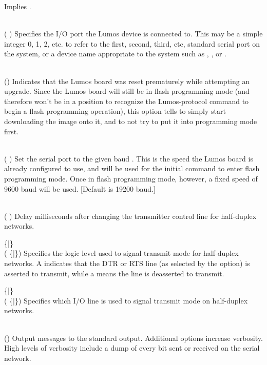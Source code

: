 \begin{list}{}{}
Implies
.
\item[{\codetype{----port=}\Var*{dev}}]\hfill\\
(
)
Specifies the I/O port the Lumos device is connected to.  This may be a simple integer 0, 1, 2, etc.
to refer to the first, second, third, etc, standard serial port on the system, or a device name appropriate
to the system such as 
,
,
or 
.
\item[{\codetype{----resume}}]\hfill\\
()
Indicates that the Lumos board was reset prematurely while attempting an upgrade.  Since the
Lumos board will still be in flash programming mode (and therefore won't
be in a position to recognize the Lumos-protocol command to begin a flash
programming operation), this option tells 
to simply start downloading the image onto it, and to not try to put it 
into programming mode first.
\item[{\codetype{----speed=}\Var*{rate}}]\hfill\\
(
)
Set the serial port to the given
baud
.
This is the speed the Lumos board is already configured to use, and will be used for the initial
command to enter flash programming mode.  Once in flash programming mode, however, a fixed speed of 9600
baud will be used.
[Default is 19200 baud.]
\item[{\codetype{----txdelay=}\Var*{t}}]\hfill\\
(
)
Delay
milliseconds after changing the transmitter control line for half-duplex networks.
\item[{\codetype{----txlevel=}\{\codetype{0}|\codetype{1}\}}]\hfill\\
(
\{|\})
Specifies the logic level used to signal transmit mode for half-duplex networks. A 
indicates that the DTR or RTS line (as selected by the
option) is asserted to transmit, while a
means the line is deasserted to transmit.
\item[{\codetype{----txmode=}\{\codetype{dtr}|\codetype{rts}\}}]\hfill\\
(
\{|\})
Specifies which I/O line is used to signal transmit mode on half-duplex networks.
\item[{\codetype{----verbose}}]\hfill\\
()
Output messages to the standard output.  Additional 
options increase verbosity.  High levels of verbosity include a dump
of every bit sent or received on the serial network.
\end{list}

